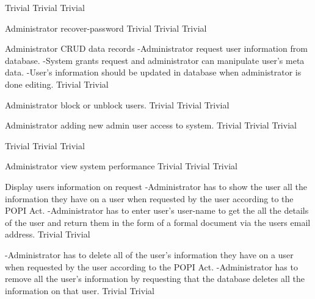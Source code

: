   	{Trivial}
	 	{Trivial}
  	{Trivial}
	  
\FuncReq
    {Administrator recover-password}		
		{Trivial}
  	{Trivial}
		{Trivial}
 
\FuncReq
    {Administrator CRUD data records}
		{-Administrator request user information from database.
		-System grants request and administrator can manipulate user's meta data.
		-User's information should be updated in database when administrator is done editing.}
		{Trivial}
 		{Trivial}

\FuncReq
    {Administrator block or unblock users.}   
    {Trivial}
    {Trivial}
    {Trivial}
		
\FuncReq
    {Administrator adding new admin user access to system.}
    {Trivial}
    {Trivial}
    {Trivial}
		
    {Trivial}
    {Trivial}
 	 	{Trivial}

\FuncReq
    {Administrator view system performance}
    {Trivial}
    {Trivial}
    {Trivial}

\FuncReq
    {Display users information on request}
    {-Administrator has to show the user all the information they have on a user when requested by the user according to the POPI Act.
  	-Administrator has to enter user's user-name to get the all the details of the user and return them in the form of a formal document via the users email address.
    }
	{Trivial}
	{Trivial}

	{-Administrator has to delete all of the user's information they have on a user when requested by the user according to the POPI 	  Act.
	-Administrator has to remove all the user's information by requesting that the database deletes all the information on that 		 user.}
	{Trivial}
	{Trivial}

